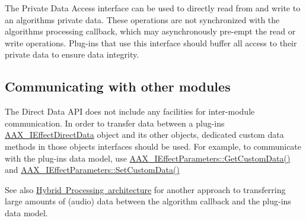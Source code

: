 The Private Data Access interface can be used to directly read from and write to an algorithm\textquotesingle{}s private data. These operations are not synchronized with the algorithm\textquotesingle{}s processing callback, which may asynchronously pre-\/empt the read or write operations. Plug-\/ins that use this interface should buffer all access to their private data to ensure data integrity.\hypertarget{a00803_auxinterface_directdata_modulecommunication}{}\subsection{Communicating with other modules}\label{a00803_auxinterface_directdata_modulecommunication}
The Direct Data A\+PI does not include any facilities for inter-\/module communication. In order to transfer data between a plug-\/in\textquotesingle{}s \mbox{\hyperlink{a01817}{A\+A\+X\+\_\+\+I\+Effect\+Direct\+Data}} object and its other objects, dedicated custom data methods in those objects\textquotesingle{} interfaces should be used. For example, to communicate with the plug-\/in\textquotesingle{}s data model, use \mbox{\hyperlink{a01669_a4728fcad006d921a07489144360f447e}{A\+A\+X\+\_\+\+I\+Effect\+Parameters\+::\+Get\+Custom\+Data()}} and \mbox{\hyperlink{a01669_aa838cad04781853ef2e0b9df22a05170}{A\+A\+X\+\_\+\+I\+Effect\+Parameters\+::\+Set\+Custom\+Data()}}

\begin{DoxySeeAlso}{See also}
\mbox{\hyperlink{a00805}{Hybrid Processing architecture}} for another approach to transferring large amounts of (audio) data between the algorithm callback and the plug-\/in\textquotesingle{}s data model. 
\end{DoxySeeAlso}
